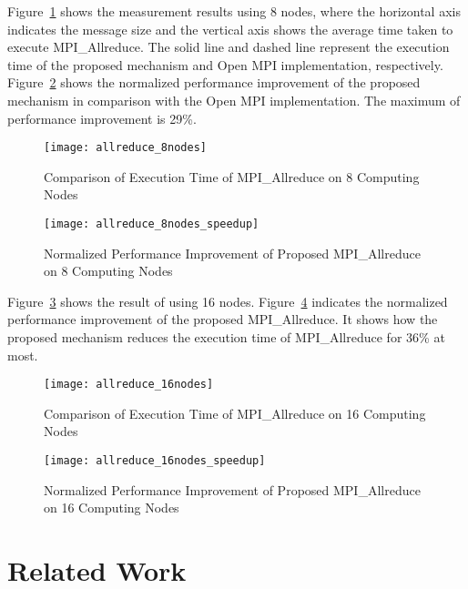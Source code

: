 Figure~\ref{fig:evaluation-8nodes} shows the measurement results using 8
nodes, where the horizontal axis indicates the message size and the
vertical axis shows the average time taken to execute
MPI\_Allreduce. The solid line and dashed line represent the
execution time of the proposed mechanism and Open MPI implementation,
respectively. Figure~\ref{fig:evaluation-8nodes-normalized} shows the
normalized performance improvement of the proposed mechanism in
comparison with the Open MPI implementation. The maximum of performance
improvement is 29\%.

\begin{figure}
    \centering
    \texttt{[image: allreduce\_8nodes]}
    \caption{Comparison of Execution Time of MPI\_Allreduce on 8 Computing Nodes}%
    \label{fig:evaluation-8nodes}
\end{figure}

\begin{figure}
    \centering
    \texttt{[image: allreduce\_8nodes\_speedup]}
    \caption{Normalized Performance Improvement of Proposed MPI\_Allreduce on 8 Computing Nodes}%
    \label{fig:evaluation-8nodes-normalized}
\end{figure}

Figure~\ref{fig:evaluation-16nodes} shows the result of using 16 nodes.
Figure~\ref{fig:evaluation-16nodes-normalized} indicates the normalized
performance improvement of the proposed MPI\_Allreduce. It
shows how the proposed mechanism reduces the execution time of
MPI\_Allreduce for 36\% at most.

\begin{figure}
    \centering
    \texttt{[image: allreduce\_16nodes]}
    \caption{Comparison of Execution Time of MPI\_Allreduce on 16 Computing Nodes}%
    \label{fig:evaluation-16nodes}
\end{figure}

\begin{figure}
    \centering
    \texttt{[image: allreduce\_16nodes\_speedup]}
    \caption{Normalized Performance Improvement of Proposed MPI\_Allreduce on 16 Computing Nodes}%
    \label{fig:evaluation-16nodes-normalized}
\end{figure}

\section{Related Work}\label{sec:iii-related-work}

